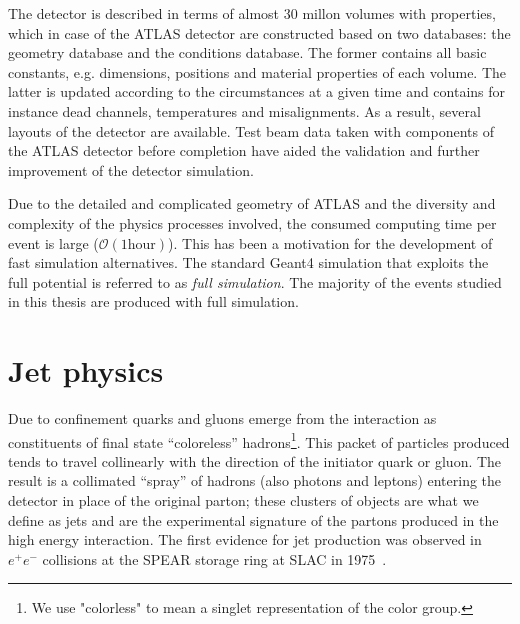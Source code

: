 The detector is described in terms of almost 30 millon volumes with properties, which in case of the ATLAS detector are constructed based on two databases: the geometry database and the conditions database. The former contains all basic constants, e.g. dimensions, positions and material properties of each volume. The latter is updated according to the circumstances at a given time and contains for instance dead channels, temperatures and misalignments. As a result, several layouts of the detector are available. Test beam data taken with components of the ATLAS detector before completion have aided the validation and further improvement of the detector simulation.

Due to the detailed and complicated geometry of ATLAS and the diversity and complexity of the physics processes involved, the consumed computing time per event is large ($\mathcal{O}(1\mbox{hour})$).  This has been a motivation for the development of fast simulation alternatives. The standard {\sc Geant}4 simulation that exploits the full potential is referred to as \emph{full simulation}.  The majority of the events studied in this thesis are produced with full simulation.


\section{Jet physics}\label{sec:jets}

Due to confinement  %
quarks and gluons emerge from the interaction as constituents of final state ``coloreless'' hadrons\footnote{We use "colorless" to mean a singlet representation of the color group.}.
This packet of particles produced tends to travel collinearly with the direction of the initiator quark or gluon. The result is a collimated ``spray'' of hadrons (also photons and leptons) entering the detector in place of the original parton; these clusters of objects are what we define as jets and are the experimental signature of the partons produced in the high energy interaction.
The first evidence for jet production was observed in $e^+e^-$ collisions at the SPEAR storage ring at SLAC in 1975~\cite{PhysRevLett.35.1609}. 


